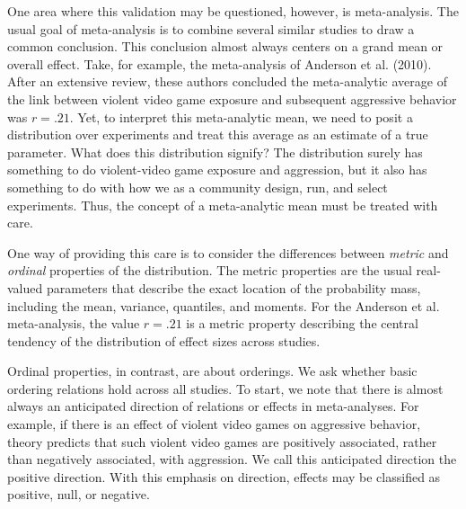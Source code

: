 \documentclass[english,man]{apa6}
\newcounter{author}
\theoremstyle{definition}
\theoremstyle{definition}
\theoremstyle{remark}
\begin{document}
One area where this validation may be questioned, however, is
meta-analysis. The usual goal of meta-analysis is to combine several
similar studies to draw a common conclusion. This conclusion almost
always centers on a grand mean or overall effect. Take, for example, the
meta-analysis of Anderson et al. (2010). After an extensive review,
these authors concluded the meta-analytic average of the link between
violent video game exposure and subsequent aggressive behavior was
\(r=.21\). Yet, to interpret this meta-analytic mean, we need to posit a
distribution over experiments and treat this average as an estimate of a
true parameter. What does this distribution signify? The distribution
surely has something to do violent-video game exposure and aggression,
but it also has something to do with how we as a community design, run,
and select experiments. Thus, the concept of a meta-analytic mean must
be treated with care.

One way of providing this care is to consider the differences between
\emph{metric} and \emph{ordinal} properties of the distribution. The
metric properties are the usual real-valued parameters that describe the
exact location of the probability mass, including the mean, variance,
quantiles, and moments. For the Anderson et al. meta-analysis, the value
\(r=.21\) is a metric property describing the central tendency of the
distribution of effect sizes across studies.

Ordinal properties, in contrast, are about orderings. We ask whether
basic ordering relations hold across all studies. To start, we note that
there is almost always an anticipated direction of relations or effects
in meta-analyses. For example, if there is an effect of violent video
games on aggressive behavior, theory predicts that such violent video
games are positively associated, rather than negatively associated, with
aggression. We call this anticipated direction the positive direction.
With this emphasis on direction, effects may be classified as positive,
null, or negative.
\end{document}
